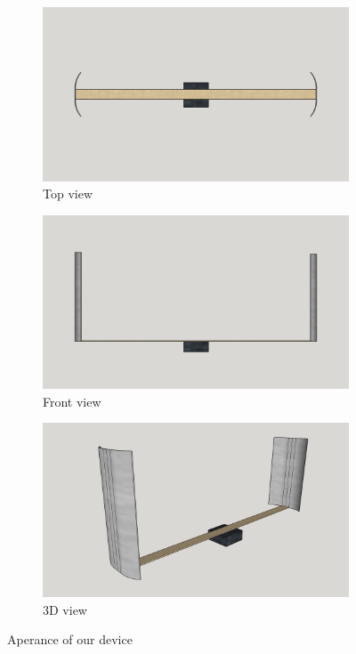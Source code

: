 \documentclass[
  print, %
  Table,   %
  nolof,     %
  nolot,     %
           oneside
]{fithesis3}
\begin{document}
\begin{figure}
  \begin{subfigure}[b]{0.5\textwidth}
    \includegraphics[width=\textwidth]{../images/top.png}
    \caption{Top view}
  \end{subfigure}
  \begin{subfigure}[b]{0.5\textwidth}
    \includegraphics[width=\textwidth]{../images/front.png}
    \caption{Front view}
  \end{subfigure}

  \begin{center}

  \begin{subfigure}[b]{0.7\textwidth}
    \includegraphics[width=\textwidth]{../images/3d.png}
    \caption{3D view}
  \end{subfigure}
  \end{center}
  \caption{Aperance of our device}
  \label{fig:device}
\end{figure}
\end{document}
